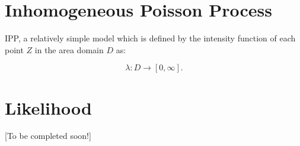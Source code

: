 \documentclass{article}
\begin{document}
\section*{Inhomogeneous Poisson Process}
IPP, a relatively simple model which is defined by the intensity function of each point $Z$ in the area domain $D$ as:

\begin{equation} \label{eq:IPP intensity function}
\lambda : D \longrightarrow [0,\infty].
\end{equation}



\section*{Likelihood}

[To be completed soon!]




\end{document}
